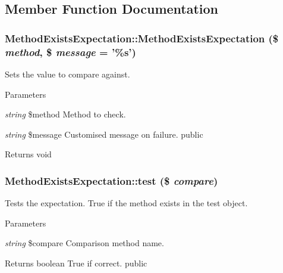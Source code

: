 \subsection{Member Function Documentation}
\hypertarget{class_method_exists_expectation_a1fcc8efdc29de2ea492548fa5add2fc2}{
\subsubsection[{MethodExistsExpectation}]{\setlength{\rightskip}{0pt plus 5cm}MethodExistsExpectation::MethodExistsExpectation (\$ {\em method}, \/  \$ {\em message} = {\ttfamily '\%s'})}}
\label{class_method_exists_expectation_a1fcc8efdc29de2ea492548fa5add2fc2}
Sets the value to compare against. 
\begin{DoxyParams}{Parameters}
\item[{\em string}]\$method Method to check. \item[{\em string}]\$message Customised message on failure.  public \end{DoxyParams}
\begin{DoxyReturn}{Returns}
void 
\end{DoxyReturn}
\hypertarget{class_method_exists_expectation_a951ee8d86b351ad3b467ea57673526d3}{
\subsubsection[{test}]{\setlength{\rightskip}{0pt plus 5cm}MethodExistsExpectation::test (\$ {\em compare})}}
\label{class_method_exists_expectation_a951ee8d86b351ad3b467ea57673526d3}
Tests the expectation. True if the method exists in the test object. 
\begin{DoxyParams}{Parameters}
\item[{\em string}]\$compare Comparison method name. \end{DoxyParams}
\begin{DoxyReturn}{Returns}
boolean True if correct.  public 
\end{DoxyReturn}


